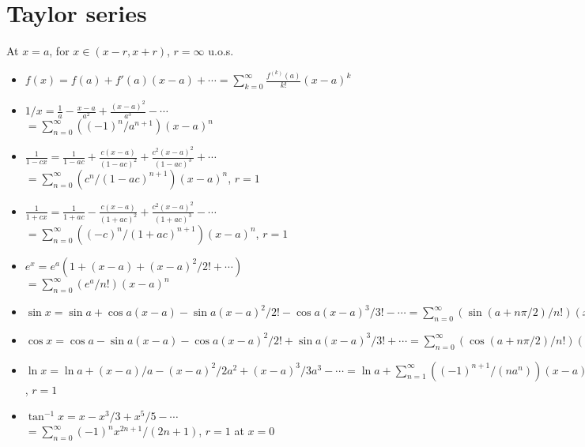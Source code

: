 \documentclass{slnotes}
\begin{document}
\section{Taylor series}
At \(x = a\), for \(x \in (x - r, x + r)\), \(r = \infty\) u.o.s.
\begin{itemize}
\item \(f(x) = f(a) + f'(a)(x-a) + \cdots = \sum^\infty_{k=0}\frac{f^{(k)}(a)}{k!}(x-a)^k\)
\item \(1/x = \frac{1}{a} - \frac{x - a}{a^2} + \frac{(x-a)^2}{a^3} - \cdots\)\\\(= \sum^\infty_{n=0}((-1)^n/a^{n+1})(x-a)^n\)
\item \(\frac{1}{1-cx} = \frac{1}{1-ac} + \frac{c(x-a)}{(1-ac)^2} + \frac{c^2(x-a)^2}{(1-ac)^3} + \cdots\)\\\(= \sum^\infty_{n=0}(c^n/(1-ac)^{n+1})(x-a)^n\), \(r = 1\)
\item \(\frac{1}{1+cx} = \frac{1}{1+ac} - \frac{c(x-a)}{(1+ac)^2} + \frac{c^2(x-a)^2}{(1+ac)^3} - \cdots\)\\\(= \sum^\infty_{n=0}((-c)^n/(1+ac)^{n+1})(x-a)^n\), \(r = 1\)
\item \(e^x = e^a(1 + (x-a) + (x-a)^2/2! + \cdots)\)\\\(= \sum^\infty_{n=0}(e^a/n!)(x-a)^n\)
\item \(\sin x = \sin a + \cos a(x-a) - \sin a(x-a)^2/2! - \cos a(x-a)^3/3! - \cdots = \sum^\infty_{n=0} (\sin(a+n\pi/2)/n!)(x-a)^n\)
\item \(\cos x = \cos a - \sin a(x-a) - \cos a(x-a)^2/2! + \sin a(x-a)^3/3! + \cdots = \sum^\infty_{n=0} (\cos(a+n\pi/2)/n!)(x-a)^n\)
\item \(\ln x = \ln a + (x-a)/a - (x-a)^2/2a^2 + (x-a)^3/3a^3 - \cdots = \ln a + \sum^\infty_{n=1} ((-1)^{n+1}/(na^n))(x-a)^n\), \(r = 1\)
\item \(\tan^{-1}x = x - x^3/3 + x^5/5 - \cdots\)\\\(= \sum^\infty_{n=0} (-1)^n x^{2n+1} / (2n+1)\), \(r = 1\) at \(x = 0\)
\end{itemize}
\end{document}
